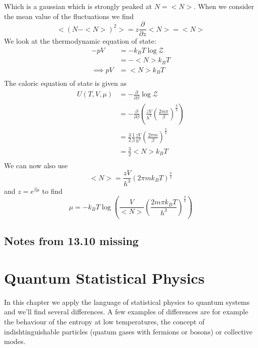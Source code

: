 \documentclass{report}
\begin{document}
Which is a gaussian which is strongly peaked at $N = <N>$. When we consider the mean value of the fluctuations we find \[
  <\left( N - <N> \right) ^2> = z \frac{\partial }{\partial z} <N> = <N>
\] 
We look at the thermodynamic equation of state:
\begin{align*}
  -pV &= - k_B T \log \mathcal{Z} \\
  &= - <N> k_B T \\
  \implies pV &= <N> k_B T \\
\end{align*}
The caloric equation of state is given as 
\begin{align*}
  U\left( T,V, \mu \right) &=  - \frac{\partial }{\partial \beta} \log \mathcal{Z}\\
                           &= -\frac{\partial }{\partial \beta} \left( \frac{zV}{h^{3}} \left( \frac{2m\pi}{\beta} \right) ^{\frac{3}{2}} \right)  \\
                           &= \frac{3}{2} \frac{1}{\beta} \frac{zV}{h^{3}} \left( \frac{2\pi m}{\beta} \right) ^{\frac{3}{2}} \\
                           &= \frac{3}{2} <N> k_B T \\
\end{align*}
We can now also use \[
  <N> = \frac{zV}{h^{3}} \left( 2\pi m k_B T \right) ^{\frac{3}{2}}
\] and $z = e^{\beta  \mu}$ to find \[
\mu = -k_B T \log\left( \frac{V}{<N>} \left( \frac{2m\pi k_B T}{h^{3}} \right) ^{\frac{3}{2}} \right) 
\] 

\section{Notes from 13.10 missing}

\chapter{Quantum Statistical Physics}
In this chapter we apply the language of statistical physics to quantum systems and we'll find several differences. A few examples of differences are for example the behaviour of the entropy at low temperatures, the concept of indishtinguishable particles (quatum gases with fermions or bosons) or collective modes.\\
\end{document}
